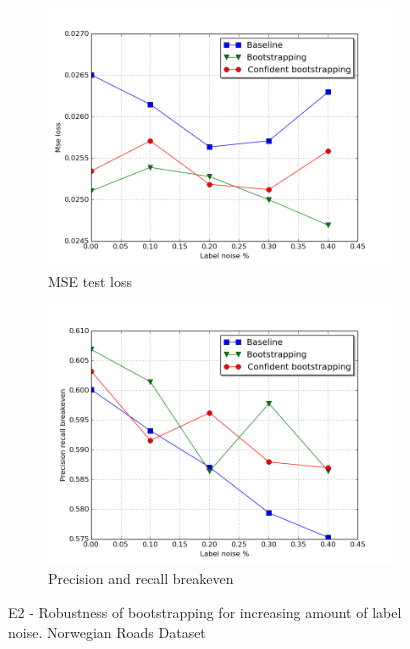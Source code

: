 \begin{figure}
\begin{subfigure}{0.5\textwidth}
\includegraphics[width=\linewidth]{figs/E2/E2_lc_noise.png}
\caption{MSE test loss} \label{fig:E2_boot_norway_loss}
\end{subfigure}
\hspace*{\fill} %
\begin{subfigure}{0.5\textwidth}
\includegraphics[width=\linewidth]{figs/E2/E2_pr_noise.png}
\caption{Precision and recall breakeven} \label{fig:E2_boot_norway_pr}
\end{subfigure}
\hspace*{\fill} %
\caption[E2 - Robustness of bootstrapping for increasing amount of label noise]{E2 - Robustness of bootstrapping for increasing amount of label noise. Norwegian Roads Dataset} \label{fig:E2_boot_norway}
\end{figure}


